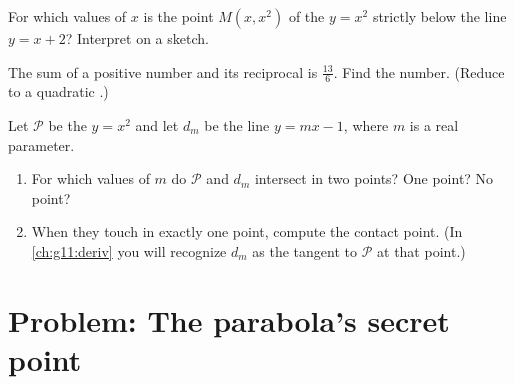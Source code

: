 \begin{exercise}[$\star\star$]\label{exo:g11:quad:9}
For which values of $x$ is the point $M(x, x^2)$ of the  $y = x^2$
strictly below the line $y = x + 2$? Interpret on a sketch.
\end{exercise}

\begin{exercise}[$\star\star$]\label{exo:g11:quad:10}
The sum of a positive number and its reciprocal is $\frac{13}{6}$. Find the
number. (Reduce to a quadratic .)
\end{exercise}

\begin{exercise}[$\star\star\star$]\label{exo:g11:quad:11}
Let $\mathcal P$ be the  $y = x^2$ and let $d_m$ be the line
$y = mx - 1$, where $m$ is a real parameter.
\begin{enumerate}
  \item For which values of $m$ do $\mathcal P$ and $d_m$ intersect in two
        points? One point? No point?
  \item When they touch in exactly one point, compute the contact point.
        (In \cref{ch:g11:deriv} you will recognize $d_m$ as the tangent to
        $\mathcal P$ at that point.)
\end{enumerate}
\end{exercise}

\section{Problem: The parabola's secret point}

